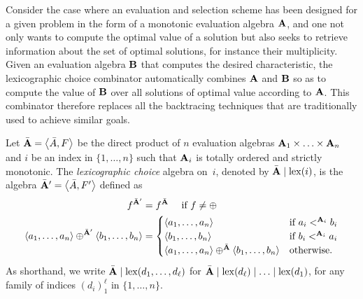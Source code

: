 Consider the case where an evaluation and selection scheme has been designed for a given problem in the form of a monotonic evaluation algebra \(\mathbf{A}\), and one not only wants to compute the optimal value of a solution but also seeks to retrieve information about the set of optimal solutions, for instance their multiplicity.
Given an evaluation algebra \(\mathbf{B}\) that computes the desired characteristic, the lexicographic choice combinator automatically combines \(\mathbf{A}\) and \(\mathbf{B}\) so as to compute the value of \(\mathbf{B}\) over all solutions of optimal value according to \(\mathbf{A}\).
This combinator therefore replaces all the backtracing techniques that are traditionally used to achieve similar goals.

\begin{definition}
    Let \(\bar{\mathbf{A}} = \left\langle\bar A, F\right\rangle\) be the direct product of \(n\) evaluation algebras \(\mathbf{A}_1 \times \ldots \times \mathbf{A}_n\) and \(i\) be an index in \(\{1, \ldots, n\}\) such that \(\mathbf{A}_i\) is totally ordered and strictly monotonic.
    The \emph{lexicographic choice} algebra on~\(i\), denoted by \(\bar{\mathbf{A}} \mid \mathrm{lex}(i)\), is the algebra \(\bar{\mathbf{A}}' = \left\langle\bar A, F'\right\rangle\) defined as
    \vspace{-1ex}
    \begin{align*}
        f^{\bar{\mathbf{A}}'} &= f^{\bar{\mathbf{A}}} \quad\text{ if } f \neq \oplus \\
        \left\langle a_1, \ldots, a_n\right\rangle
        \mathbin{\mathbin{\oplus}^{\bar{\mathbf{A}}'}}
        \left\langle b_1, \ldots, b_n\right\rangle
        &= \begin{cases}
            \left\langle a_1, \ldots, a_n\right\rangle & \text{if } a_i <^{\mathbf{A}_i} b_i \\
            \left\langle b_1, \ldots, b_n\right\rangle & \text{if } b_i <^{\mathbf{A}_i} a_i \\
            \left\langle a_1, \ldots, a_n\right\rangle \mathbin{\mathbin{\oplus}^{\bar{\mathbf{A}}}}
                \left\langle b_1, \ldots, b_n\right\rangle & \text{otherwise.} \\
        \end{cases}
    \end{align*}
    As shorthand, we write \(\bar{\mathbf{A}} \mid \mathrm{lex}(d_1, \ldots, d_\ell)\) for \(\bar{\mathbf{A}} \mid \mathrm{lex}(d_\ell) \mid \ldots \mid \mathrm{lex}(d_1)\), for any family of indices \((d_i)_1^\ell\) in \(\{1, \ldots, n\}\).
\end{definition}

